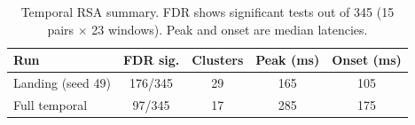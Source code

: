 \begin{table}[ht]
  \centering
  \scriptsize
  \setlength{\tabcolsep}{3pt}
  \caption{Temporal RSA summary. FDR shows significant tests out of 345
  (15 pairs $\times$ 23 windows). Peak and onset are median latencies.}
  \label{tab:temporal-summary}
  \begin{tabular}{lcccc}
    \toprule
    Run & FDR sig. & Clusters & Peak (ms) & Onset (ms) \\
    \midrule
    Landing (seed 49) & 176/345 & 29 & 165 & 105 \\
    Full temporal & 97/345 & 17 & 285 & 175 \\
    \bottomrule
  \end{tabular}
\end{table}
